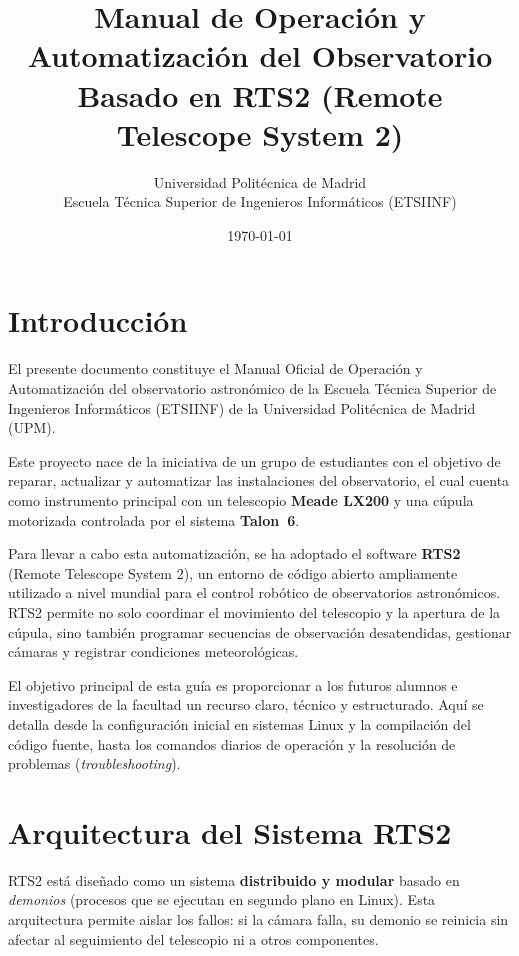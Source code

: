 \documentclass[12pt,a4paper,titlepage]{article}
\title{Manual de Operación y Automatización del Observatorio\\
\large Basado en RTS2 (Remote Telescope System 2)}
\author{Universidad Politécnica de Madrid \\ Escuela Técnica Superior de Ingenieros Informáticos (ETSIINF)}
\date{\today}
\begin{document}
\maketitle
\tableofcontents
\newpage

\section{Introducción}

El presente documento constituye el Manual Oficial de Operación y Automatización del observatorio astronómico de la Escuela Técnica Superior de Ingenieros Informáticos (ETSIINF) de la Universidad Politécnica de Madrid (UPM).

Este proyecto nace de la iniciativa de un grupo de estudiantes con el objetivo de reparar, actualizar y automatizar las instalaciones del observatorio, el cual cuenta como instrumento principal con un telescopio \textbf{Meade LX200} y una cúpula motorizada controlada por el sistema \textbf{Talon~6}.

Para llevar a cabo esta automatización, se ha adoptado el software \textbf{RTS2} (Remote Telescope System 2), un entorno de código abierto ampliamente utilizado a nivel mundial para el control robótico de observatorios astronómicos. RTS2 permite no solo coordinar el movimiento del telescopio y la apertura de la cúpula, sino también programar secuencias de observación desatendidas, gestionar cámaras y registrar condiciones meteorológicas.

El objetivo principal de esta guía es proporcionar a los futuros alumnos e investigadores de la facultad un recurso claro, técnico y estructurado. Aquí se detalla desde la configuración inicial en sistemas Linux y la compilación del código fuente, hasta los comandos diarios de operación y la resolución de problemas (\textit{troubleshooting}).

\section{Arquitectura del Sistema RTS2}

RTS2 está diseñado como un sistema \textbf{distribuido y modular} basado en \textit{demonios} (procesos que se ejecutan en segundo plano en Linux). Esta arquitectura permite aislar los fallos: si la cámara falla, su demonio se reinicia sin afectar al seguimiento del telescopio ni a otros componentes.
\end{document}

